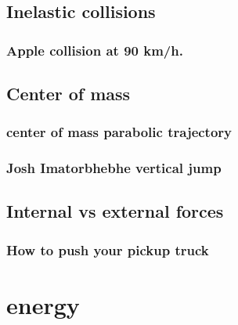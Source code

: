 \documentclass[
  letterpaper,
  DIV=11,
  numbers=noendperiod]{scrreprt}
\begin{document}
\section*{Inelastic collisions}\label{inelastic-collisions}


\subsection*{Apple collision at 90
km/h.}\label{apple-collision-at-90-kmh.}

\section*{Center of mass}\label{center-of-mass}


\subsection*{center of mass parabolic
trajectory}\label{center-of-mass-parabolic-trajectory}

\subsection*{Josh Imatorbhebhe vertical
jump}\label{josh-imatorbhebhe-vertical-jump}

\section*{Internal vs external
forces}\label{internal-vs-external-forces}


\subsection*{How to push your pickup
truck}\label{how-to-push-your-pickup-truck}

\chapter*{energy}\label{energy}
\end{document}

